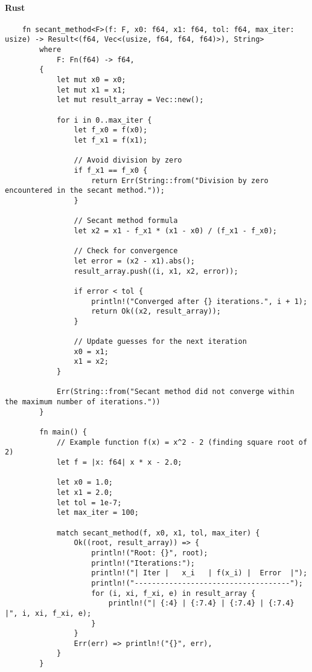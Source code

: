 \documentclass{article}
\begin{document}
            \paragraph{Rust}
                \begin{verbatim}
    fn secant_method<F>(f: F, x0: f64, x1: f64, tol: f64, max_iter: usize) -> Result<(f64, Vec<(usize, f64, f64, f64)>), String>
        where
            F: Fn(f64) -> f64,
        {
            let mut x0 = x0;
            let mut x1 = x1;
            let mut result_array = Vec::new();

            for i in 0..max_iter {
                let f_x0 = f(x0);
                let f_x1 = f(x1);

                // Avoid division by zero
                if f_x1 == f_x0 {
                    return Err(String::from("Division by zero encountered in the secant method."));
                }

                // Secant method formula
                let x2 = x1 - f_x1 * (x1 - x0) / (f_x1 - f_x0);

                // Check for convergence
                let error = (x2 - x1).abs();
                result_array.push((i, x1, x2, error));

                if error < tol {
                    println!("Converged after {} iterations.", i + 1);
                    return Ok((x2, result_array));
                }

                // Update guesses for the next iteration
                x0 = x1;
                x1 = x2;
            }

            Err(String::from("Secant method did not converge within the maximum number of iterations."))
        }

        fn main() {
            // Example function f(x) = x^2 - 2 (finding square root of 2)
            let f = |x: f64| x * x - 2.0;

            let x0 = 1.0;
            let x1 = 2.0;
            let tol = 1e-7;
            let max_iter = 100;

            match secant_method(f, x0, x1, tol, max_iter) {
                Ok((root, result_array)) => {
                    println!("Root: {}", root);
                    println!("Iterations:");
                    println!("| Iter |   x_i   | f(x_i) |  Error  |");
                    println!("------------------------------------");
                    for (i, xi, f_xi, e) in result_array {
                        println!("| {:4} | {:7.4} | {:7.4} | {:7.4} |", i, xi, f_xi, e);
                    }
                }
                Err(err) => println!("{}", err),
            }
        }
                \end{verbatim}
\end{document}

